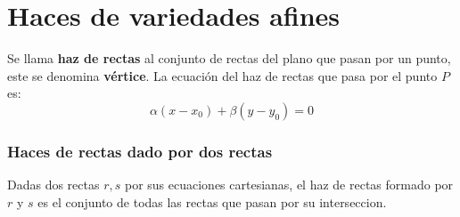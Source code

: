 \documentclass{./Geometria.tex}
\begin{document}
\section{Haces de variedades afines}
Se llama \textbf{haz de rectas} al conjunto de rectas del plano que pasan por un punto, este se denomina \textbf{vértice}. La ecuación del haz de rectas que pasa por el punto $P$ es:
\[
	\alpha(x-x_0)+\beta(y-y_0)=0
\]
\subsubsection{Haces de rectas dado por dos rectas}
Dadas dos rectas $r,s$ por sus ecuaciones cartesianas, el haz de rectas formado por $r$ y $s$ es el conjunto de todas las rectas que pasan por su interseccion.
\end{document}
